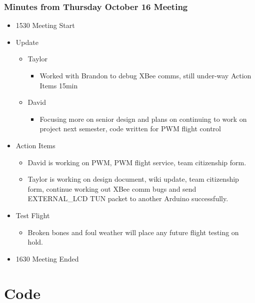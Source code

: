 \documentclass[pdftex,11pt]{article}
\begin{document}
\subsubsection[short]{Minutes from Thursday October 16 Meeting}
\begin{itemize}
	\item 1530 \indent Meeting Start
	\item Update
	\begin{itemize}
		\item Taylor
		\begin{itemize}
			\item Worked with Brandon to debug XBee comms, still under-way Action Items 15min
		\end{itemize}
		\item David
		\begin{itemize}
			\item  Focusing more on senior design and plans on continuing to work on project next semester, code written for PWM flight control
		\end{itemize}
	\end{itemize}
	
	\item Action Items
	\begin{itemize}
		\item David is working on PWM, PWM flight service, team citizenship form.
		\item Taylor is working on design document, wiki update, team citizenship form, continue working out XBee comm bugs and send EXTERNAL\_LCD TUN packet to another Arduino successfully.
	\end{itemize}
	\item Test Flight
	\begin{itemize}
		\item  Broken bones and foul weather will place any future flight testing on hold.
	\end{itemize}
	\item 1630 \indent Meeting Ended
\end{itemize}	


\clearpage

\section{Code}
\label{sec:code}
\end{document}
